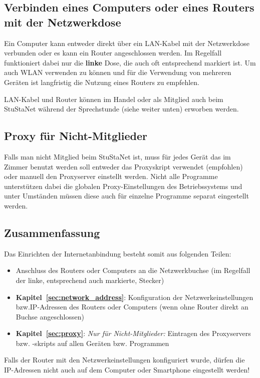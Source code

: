 \documentclass[a4paper,12pt]{scrartcl}
\begin{document}
\subsection{Verbinden eines Computers oder eines Routers mit der Netzwerkdose}
Ein Computer kann entweder direkt über ein LAN-Kabel mit der Netzwerkdose verbunden oder es kann ein Router angeschlossen werden.
Im Regelfall funktioniert dabei nur die \textbf{linke} Dose, die auch oft entsprechend markiert ist. 
Um auch WLAN verwenden zu können und für die Verwendung von mehreren Geräten ist langfristig die Nutzung eines Routers zu empfehlen.

LAN-Kabel und Router können im Handel oder als Mitglied auch beim StuStaNet während der Sprechstunde (siehe weiter unten) erworben werden.

\subsection{Proxy für Nicht-Mitglieder}

Falls man nicht Mitglied beim StuStaNet ist, muss für jedes Gerät das im Zimmer benutzt werden soll entweder das Proxyskript verwendet (empfohlen) oder manuell den Proxyserver einstellt werden.
Nicht alle Programme unterstützen dabei die globalen Proxy-Einstellungen des Betriebssystems und unter Umständen müssen diese auch für einzelne Programme separat eingestellt werden.

\subsection{Zusammenfassung
}
Das Einrichten der Internetanbindung besteht somit aus folgenden Teilen:
\begin{itemize}
	\item Anschluss des Routers oder Computers an die Netzwerkbuchse (im Regelfall der linke, entsprechend auch markierte, Stecker)
	\item \textbf{Kapitel~\ref{sec:network_address}}: Konfiguration der Netzwerkeinstellungen bzw.\@ IP-Adressen des Routers oder Computers (wenn ohne Router direkt an Buchse angeschlossen)
	\item \textbf{Kapitel~\ref{sec:proxy}}: \textit{Nur für Nicht-Mitglieder:} Eintragen des Proxyservers bzw. -skripts auf allen Geräten bzw. Programmen
\end{itemize}

Falls der Router mit den Netzwerkeinstellungen konfiguriert wurde, dürfen die IP-Adressen nicht auch auf dem Computer oder Smartphone eingestellt werden!
\end{document}
